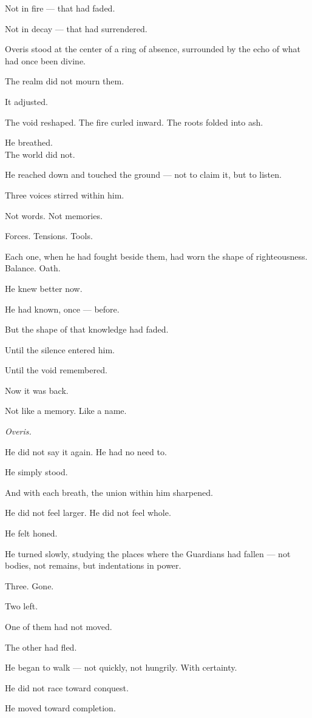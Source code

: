 \documentclass[12pt]{article}
\begin{document}
Not in fire — that had faded.

Not in decay — that had surrendered.

Overis stood at the center of a ring of absence, surrounded by the echo of what had once been divine.

The realm did not mourn them.

It adjusted.

The void reshaped. The fire curled inward. The roots folded into ash.

He breathed.\\
The world did not.

He reached down and touched the ground — not to claim it, but to listen.

Three voices stirred within him.

Not words. Not memories.

Forces. Tensions. Tools.

Each one, when he had fought beside them, had worn the shape of righteousness. Balance. Oath.

He knew better now.

He had known, once — before.

But the shape of that knowledge had faded.

Until the silence entered him.

Until the void remembered.

Now it was back.

Not like a memory. Like a name.

\emph{Overis.}

He did not say it again. He had no need to.

He simply stood.

And with each breath, the union within him sharpened.

He did not feel larger. He did not feel whole.

He felt honed.

He turned slowly, studying the places where the Guardians had fallen — not bodies, not remains, but indentations in power.

Three. Gone.

Two left.

One of them had not moved.

The other had fled.

He began to walk — not quickly, not hungrily. With certainty.

He did not race toward conquest.

He moved toward completion.
\end{document}
